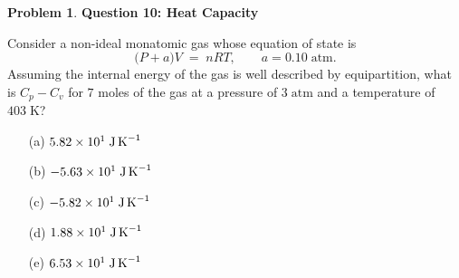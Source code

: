 \documentclass[10pt]{article}
\theoremstyle{definition} %
\newtheorem{problem}{Problem}
\theoremstyle{plain} %
\begin{document}
                                      \begin{problem}
                                        \textbf{Question 10: Heat Capacity}
                                        
                                        Consider a non-ideal monatomic gas whose equation of state is
                                        \[
                                           \bigl(P + a\bigr)V \;=\; nRT,
                                           \qquad a = 0.10\;\text{atm}.
                                        \]
                                        Assuming the internal energy of the gas is well described by equipartition,
                                        what is \(C_{p} - C_{v}\) for \(7\) moles of the gas at a pressure of
                                        \(3\;\text{atm}\) and a temperature of \(403\;\text{K}\)?
                                        
                                        \begin{enumerate}
                                          \item[(a)] \(5.82\times10^{1}\;\text{J\,K}^{-1}\)
                                          \item[(b)] \(-5.63\times10^{1}\;\text{J\,K}^{-1}\)
                                          \item[(c)] \(-5.82\times10^{1}\;\text{J\,K}^{-1}\)
                                          \item[(d)] \(1.88\times10^{1}\;\text{J\,K}^{-1}\)
                                          \item[(e)] \(6.53\times10^{1}\;\text{J\,K}^{-1}\)
                                        \end{enumerate}
                                        \end{problem}
\end{document}
